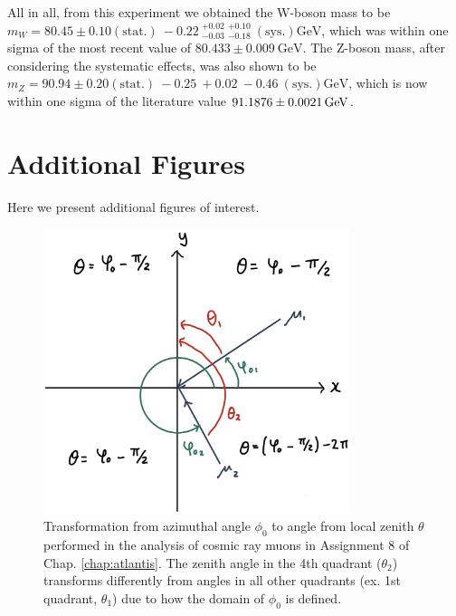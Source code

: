 \documentclass[a4paper]{report}
\numberwithin{equation}{section}
\begin{document}
All in all, from this experiment we obtained the W-boson mass to be $m_W = 80.45 \pm 0.10 (\mathrm{stat.}) \: -0.22 \: 
^{+0.02}_{-0.03} \: ^{+0.10}_{-0.18} \: (\mathrm{sys.}) \si{\giga\electronvolt}$, which was within one sigma of the most recent 
value of  $80.433 \pm 0.009 \ \text{GeV}$. The Z-boson mass, after considering the systematic effects, was also shown to be $m_Z = 90.94 \pm 0.20 (\mathrm{stat.}) \: 
-0.25 \: + 0.02 \: -0.46 \: (\mathrm{sys.}) \si{\giga\electronvolt}$, which is now within one sigma of the literature value 
$\SI{91.1876 \pm 0.0021}{\giga\electronvolt}$. 

\printbibliography

\appendix

\chapter{Additional Figures} \label{chap:appendix_figs}

Here we present additional figures of interest.

\begin{figure}[htpb]
    \centering
    \includegraphics[width=0.8\textwidth]{cosmicray_transf_axes.png}
    \caption{Transformation from azimuthal angle $\phi_0$ to angle from local zenith $\theta$ performed in the analysis of 
    cosmic ray muons in Assignment 8 of Chap. \ref{chap:atlantis}. The zenith angle in the 4th quadrant ($\theta_2$) transforms 
    differently from angles in all other quadrants (ex. 1st quadrant, $\theta_1$) due to how the domain of $\phi_0$ is defined.}
    \label{fig:cr_transf_axes}
\end{figure}
\end{document}
